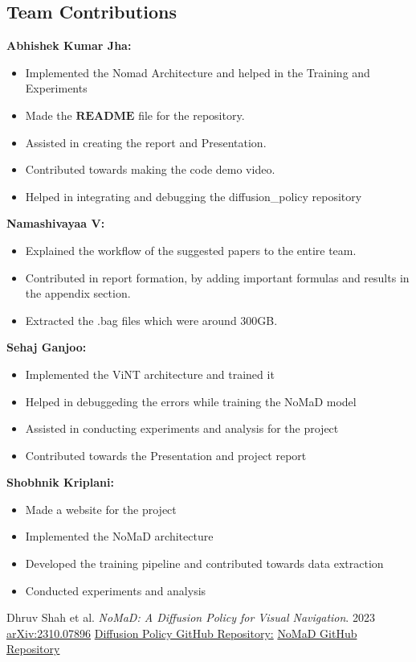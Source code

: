 \documentclass[12pt]{article}
\begin{document}
\begin{appendices}
\section{Team Contributions}
\label{app:team_contributions}
\textbf{Abhishek Kumar Jha:} \\
    \begin{itemize}
        \item Implemented the Nomad Architecture and helped in the Training and Experiments 
        \item Made the $\textbf{README}$ file for the repository.
        \item Assisted in creating the report and Presentation.
        \item Contributed towards making the code demo video.
        \item Helped in integrating and debugging the diffusion\_policy repository
    \end{itemize}
    \textbf{Namashivayaa V:} \\
    \begin{itemize}
        \item Explained the workflow of the suggested papers to the entire team.
        \item Contributed in report formation, by adding important formulas and results in the appendix section.
        \item Extracted the .bag files which were around 300GB.
    \end{itemize}
    \textbf{Sehaj Ganjoo:} \\
    \begin{itemize}
        \item Implemented the ViNT architecture and trained it
        \item Helped in debuggeding the errors while training the NoMaD model
        \item Assisted in conducting experiments and analysis for the project
        \item Contributed towards the Presentation and project report
    \end{itemize}
    \textbf{Shobhnik Kriplani:} \\
    \begin{itemize}
        \item Made a website for the project
        \item Implemented the NoMaD architecture
        \item Developed the training pipeline and contributed towards data extraction
        \item Conducted experiments and analysis
    \end{itemize}
\newpage
\begin{thebibliography}{9}
\label{references}
Dhruv Shah et al.
\textit{NoMaD: A Diffusion Policy for Visual Navigation}.
2023
\href{https://arxiv.org/abs/2310.07896}{arXiv:2310.07896}
\href{https://github.com/wayveai/diffusion-policy}{Diffusion Policy GitHub Repository:}
\href{https://github.com/robodhruv/visualnav-transformer}{NoMaD GitHub Repository}


\end{thebibliography}
\end{appendices}
\end{document}
